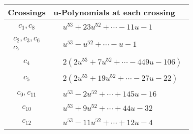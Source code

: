 \documentclass[1p]{elsarticle_modified}
\theoremstyle{definition}
\begin{document}
\begin{tabular}{m{50pt}|m{274pt}}
Crossings & \hspace{64pt}u-Polynomials at each crossing \\
\hline $$\begin{aligned}c_{1},c_{8}\end{aligned}$$&$\begin{aligned}
&u^{53}+23 u^{52}+\cdots-11 u-1
\end{aligned}$\\
\hline $$\begin{aligned}c_{2},c_{3},c_{6}\\c_{7}\end{aligned}$$&$\begin{aligned}
&u^{53}- u^{52}+\cdots- u-1
\end{aligned}$\\
\hline $$\begin{aligned}c_{4}\end{aligned}$$&$\begin{aligned}
&2(2 u^{53}+7 u^{52}+\cdots-449 u-106)
\end{aligned}$\\
\hline $$\begin{aligned}c_{5}\end{aligned}$$&$\begin{aligned}
&2(2 u^{53}+19 u^{52}+\cdots-27 u-22)
\end{aligned}$\\
\hline $$\begin{aligned}c_{9},c_{11}\end{aligned}$$&$\begin{aligned}
&u^{53}-2 u^{52}+\cdots+145 u-16
\end{aligned}$\\
\hline $$\begin{aligned}c_{10}\end{aligned}$$&$\begin{aligned}
&u^{53}+9 u^{52}+\cdots+44 u-32
\end{aligned}$\\
\hline $$\begin{aligned}c_{12}\end{aligned}$$&$\begin{aligned}
&u^{53}-11 u^{52}+\cdots+12 u-4
\end{aligned}$\\
\hline
\end{tabular}\\~\\
\end{document}
